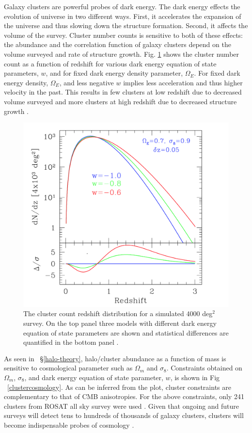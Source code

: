 Galaxy clusters are powerful probes of dark energy. The dark energy effects the evolution of universe in two different ways. 
First, it accelerates the expansion of the universe and thus slowing down the structure formation. Second, it affects the volume of the survey. Cluster number counts is sensitive to both of these effects: the abundance and the correlation function of galaxy clusters depend on the volume surveyed and rate of structure growth. Fig. \ref{de_plot} shows the cluster number count as a function of redshift for various dark energy equation of state parameters, $w$, and for fixed dark energy density parameter, $\Omega_{E}$. For fixed dark energy density, $\Omega_{E}$, and less negative $w$ implies less acceleration and thus higher velocity in the past. 
This results in few clusters at low redshift due to decreased volume surveyed and more clusters at high redshift due to decreased structure growth \citep{mohr03}.
\begin{figure}[htb]
\includegraphics[width = \columnwidth]{figs/cluster_de_plot.png}
\caption{The cluster count redshift distribution for a simulated 4000 deg$^{2}$ survey. On the top panel three models with different dark energy equation of state parameters are shown and statistical differences are quantified in the bottom panel \citep{mohr03}. }
\label{de_plot}
\end{figure}


As seen in ~\S\ref{halo-theory}, halo/cluster abundance as a function of mass is sensitive to cosmological parameter such as $\Omega_{m}$ and $\sigma_{8}$. 
Constraints obtained on $\Omega_{m}$, $\sigma_{8}$, and dark energy equation of state parameter, $w$, is shown in Fig ~\ref{clustercosmology}.
As can be inferred from the plot, cluster constraints are complementary to that of CMB anisotropies. For the above constraints, only 241 clusters from ROSAT all sky survey were used \citep{mantz15}. Given that ongoing and future surveys will detect tens to hundreds of thousands of galaxy clusters, clusters will become indispensable probes of cosmology \citep{so18, bender18, lsst09,erosita12,cmbs4-sb1}. %

